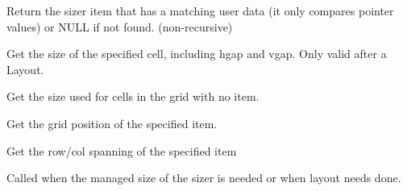 \label{wxgridbagsizerfinditemwithdata}


Return the sizer item that has a matching user data (it only compares
pointer values) or NULL if not found. (non-recursive)



\label{wxgridbagsizergetcellsize}


Get the size of the specified cell, including hgap and vgap.  Only
valid after a Layout.



\label{wxgridbagsizergetemptycellsize}


Get the size used for cells in the grid with no item.



\label{wxgridbagsizergetitemposition}




Get the grid position of the specified item.



\label{wxgridbagsizergetitemspan}




Get the row/col spanning of the specified item



\label{wxgridbagsizerrecalcsizes}


Called when the managed size of the sizer is needed or when layout
needs done.


